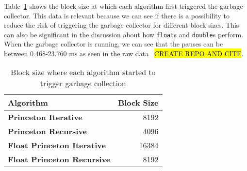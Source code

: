 Table~\ref{tab:result:gc:trigger:2} shows the block size at which each algorithm first triggered the garbage collector. This data is relevant because we can see if there is a possibility to reduce the risk of triggering the garbage collector for different block sizes. This can also be significant in the discussion about how \texttt{float}s and \texttt{double}s perform. When the garbage collector is running, we can see that the pauses can be between 0.468-23.760 ms as seen in the raw data~\cite{} \hl{CREATE REPO AND CITE}.

\ifrelease
\begin{table}[H]
    \centering
    \caption{Block size where each algorithm started to trigger garbage collection}
    \label{tab:result:gc:trigger:2}
    \begin{tabular}{lr}\toprule
        \textbf{Algorithm} & \textbf{Block Size}\\\midrule
        \textbf{Princeton Iterative} & 8192\\
        \textbf{Princeton Recursive} & 4096\\
        \textbf{Float Princeton Iterative} & 16384\\
        \textbf{Float Princeton Recursive} & 8192\\
        \bottomrule
    \end{tabular}
\end{table}
\fi
